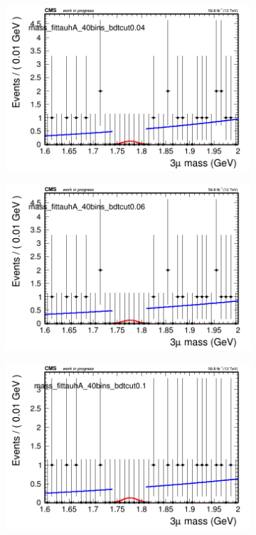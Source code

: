 \begin{figure}[H]
\begin{subfigure}{0.2\textwidth}
        \includegraphics[width=\textwidth]{power_law/plots/tauhA/massfit_tauhA_40bins_bdtcut0.04.png}
        \caption{}
    \end{subfigure}
    \begin{subfigure}{0.2\textwidth}
        \includegraphics[width=\textwidth]{power_law/plots/tauhA/massfit_tauhA_40bins_bdtcut0.06.png}
        \caption{}
    \end{subfigure}
    \begin{subfigure}{0.2\textwidth}
        \includegraphics[width=\textwidth]{power_law/plots/tauhA/massfit_tauhA_40bins_bdtcut0.1.png}

\end{subfigure}
\end{figure}
